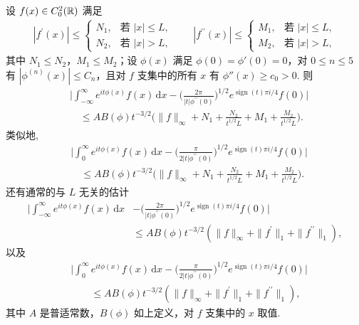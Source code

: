 \begin{lemma}[驻相引理]\label{lem:9.3}
设 $f(x) \in C_0^2(\mathbb{R})$ 满足
\begin{align*}
  \left|f^{\prime}(x)\right|\leq\begin{cases}
    N_{1}, & \text{若 } \left|x\right|\leq L,\\
    N_{2}, & \text{若 } \left|x\right|>L,
  \end{cases}
  \qquad
  \left|f^{\prime\prime}(x)\right|\leq\begin{cases}
    M_{1}, & \text{若 } \left|x\right|\leq L,\\
    M_{2}, & \text{若 } \left|x\right|>L,
  \end{cases}
\end{align*}
其中 $N_{1} \leq N_{2}$，$M_{1} \leq M_{2}$；设 $\phi(x)$ 满足 $\phi(0) = \phi'(0) = 0$，对 $0 \leq n \leq 5$ 有 $|\phi^{(n)}(x)| \leq C_{n}$，且对 $f$ 支集中的所有 $x$ 有 $\phi''(x) \geq c_{0} > 0$. 则
\begin{equation}\label{eq:9.5}
  \begin{aligned}
  &\Big|\int_{-\infty}^{\infty}e^{it\phi(x)}f(x)\,\mathrm{d}x
   -\Big(\frac{2\pi}{|t|\phi^{\prime\prime}(0)}\Big)^{1/2}e^{\operatorname{sign}(t)\pi i/4}f(0)\Big|\\
  &\quad\leq AB(\phi)t^{-3/2}\Big(\|f\|_{\infty}+N_{1}+\frac{N_{2}}{t^{1/2}L}+M_{1}+\frac{M_{2}}{t^{1/2}L}\Big).
  \end{aligned}
\end{equation}
类似地,
\begin{equation}\label{eq:9.6}
  \begin{aligned}
  &\Big|\int_{0}^{\infty}e^{it\phi(x)}f(x)\,\mathrm{d}x
   -\Big(\frac{\pi}{2|t|\phi^{\prime\prime}(0)}\Big)^{1/2}e^{\operatorname{sign}(t)\pi i/4}f(0)\Big|\\
  &\quad\leq AB(\phi)t^{-3/2}\Big(\|f\|_{\infty}+N_{1}+\frac{N_{2}}{t^{1/2}L}+M_{1}+\frac{M_{2}}{t^{1/2}L}\Big).
  \end{aligned}
\end{equation}
还有通常的与 $L$ 无关的估计
\begin{equation}\label{eq:9.7}
  \begin{aligned}
  \Big|\int_{-\infty}^{\infty}e^{it\phi(x)}f(x)\,\mathrm{d}x
  &-\Big(\frac{2\pi}{|t|\phi^{\prime\prime}(0)}\Big)^{1/2}e^{\operatorname{sign}(t)\pi i/4}f(0)\Big|\\
  &\leq AB(\phi)t^{-3/2}\left(\|f\|_{\infty}+\|f^{\prime}\|_{1}+\|f^{\prime\prime}\|_{1}\right),
  \end{aligned}
\end{equation}
以及
\begin{equation}\label{eq:9.8}
  \begin{aligned}
  &\Big|\int_{0}^{\infty}e^{it\phi(x)}f(x)\,\mathrm{d}x
   -\Big(\frac{\pi}{2|t|\phi^{\prime\prime}(0)}\Big)^{1/2}e^{\operatorname{sign}(t)\pi i/4}f(0)\Big|\\
  &\qquad\leq AB(\phi)t^{-3/2}\left(\|f\|_{\infty}+\|f^{\prime}\|_{1}+\|f^{\prime\prime}\|_{1}\right),
  \end{aligned}
\end{equation}
其中 $A$ 是普适常数，$B(\phi)$ 如上定义，对 $f$ 支集中的 $x$ 取值.


\end{lemma}
